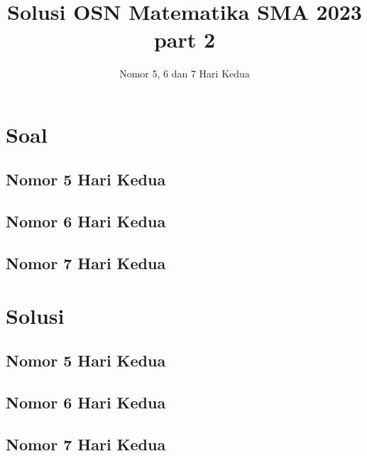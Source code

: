 \documentclass[12pt]{scrartcl}
\title{Solusi OSN Matematika SMA 2023 part 2}
\author{Nomor 5, 6 dan 7 Hari Kedua}
\date{}
\begin{document}
\maketitle
\newpage
\section{Soal}
\subsection{Nomor 5 Hari Kedua}

\subsection{Nomor 6 Hari Kedua}

\subsection{Nomor 7 Hari Kedua}


\section{Solusi}
\subsection{Nomor 5 Hari Kedua}

\subsection{Nomor 6 Hari Kedua}

\subsection{Nomor 7 Hari Kedua}

\end{document}
